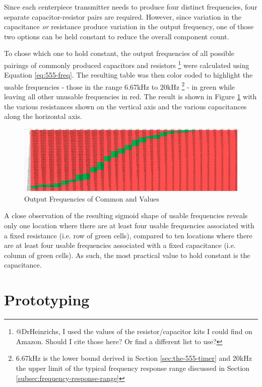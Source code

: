 Since each centerpiece transmitter needs to produce four distinct frequencies, four separate capacitor-resistor pairs are required. 
However, since variation in the capacitance \emph{or} resistance produce variation in the output frequency, one of those two options can be held constant to reduce the overall component count.

To chose which one to hold constant, the output frequencies of all possible pairings of commonly produced capacitors and resistors \footnote{@DrHeinrichs, I used the values of the resistor/capacitor kits I could find on Amazon. Should I cite those here? Or find a different list to use?} were calculated using Equation \ref{eq:555-freq}. 
The resulting table was then color coded to highlight the usable frequencies - those in the range 6.67kHz to 20kHz \footnote{6.67kHz is the lower bound derived in Section \ref{sec:the-555-timer} and 20kHz the upper limit of the typical frequency response range discussed in Section \ref{subsec:frequency-response-range}} - in green while leaving all other unusable frequencies in red. The result is shown in Figure \ref{fig:freq-selection} with the various resistances shown on the vertical axis and the various capacitances along the horizontal axis.

\begin{figure}[h]
    \centering
    \caption{Output Frequencies of Common  and  Values}
    \label{fig:freq-selection}
    \includegraphics[width=\linewidth]{Figures/6 PCB Design/freq_selection.png}
\end{figure}

A close observation of the resulting sigmoid shape of usable frequencies reveals only one location where there are at least four usable frequencies associated with a fixed resistance (i.e. row of green cells), compared to ten locations where there are at least four usable frequencies associated with a fixed capacitance (i.e. column of green cells).
As such, the most practical value to hold constant is the capacitance.

\section{Prototyping}

